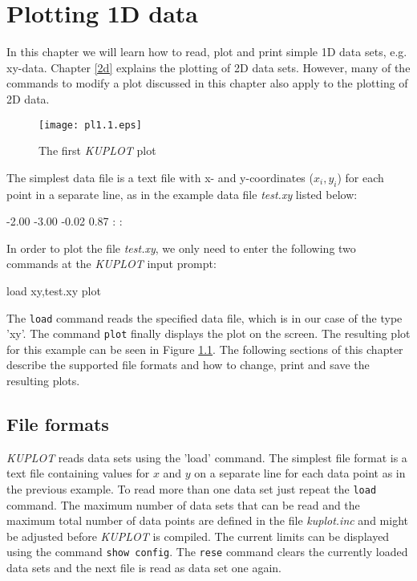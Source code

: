 
\chapter{Plotting 1D data \label {1d}}

In this chapter we will learn how to read, plot and print simple
1D data sets, e.g.  xy-data.  Chapter \ref{2d} explains the
plotting of 2D data sets.  However, many of the commands to modify
a plot discussed in this chapter also apply to the plotting of 2D
data.

\begin{figure}[!b]
   \centering
   \texttt{[image: pl1.1.eps]}
   \caption{The first {\it KUPLOT} plot}
   \label{pl1-fig1}
\end{figure}

The simplest data file is a text file with x- and y-coordinates
($x_{i},y_{i}$) for each point in a separate line, as in the example
data file {\it test.xy} listed below:
%
\begin{MacVerbatim}
    -2.00 -3.00
    -0.02  0.87
      :     :
\end{MacVerbatim}
%
In order to plot the file {\it test.xy}, we only need to enter the
following two commands at the {\it KUPLOT} input prompt:
%
\begin{MacVerbatim}
    load xy,test.xy
    plot
\end{MacVerbatim}
%
The {\tt load} command reads the specified data file, which is in
our case of the type 'xy'. The command {\tt plot} finally displays
the plot on the screen. The resulting plot for this example can be
seen in Figure \ref{pl1-fig1}. The following sections of this
chapter describe the supported file formats and how to change, print
and save the resulting plots.


\section{File formats \label{1d-read}}

{\it KUPLOT} reads data sets using the 'load' command.  The simplest
file format is a text file containing values for $x$ and $y$ on a
separate line for each data point as in the previous example.  To
read more than one data set just repeat the {\tt load} command.  The
maximum number of data sets that can be read and the maximum total
number of data points are defined in the file {\it kuplot.inc} and
might be adjusted before {\it KUPLOT} is compiled. The current
limits can be displayed using the command {\tt show config}. The
{\tt rese} command clears the currently loaded data sets and the
next file is read as data set one again. \par

